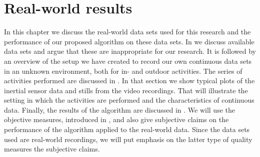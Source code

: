 
\chapter{Real-world results}

\label{Chapter6} %


In this chapter we discuss the real-world data sets used for this research and the performance of our proposed algorithm on these data sets.
In  we discuss available data sets and argue that these are inappropriate for our research.
It is followed by an overview of the setup we have created to record our own continuous data sets in an unknown environment, both for in- and outdoor activities.
The series of activities performed are discussed in .
In that section we show typical plots of the inertial sensor data and stills from the video recordings.
That will illustrate the setting in which the activities are performed and the characteristics of continuous data.
Finally, the results of the algorithm are discussed in .
We will use the objective measures, introduced in , and also give subjective claims on the performance of the algorithm applied to the real-world data.
Since the data sets used are real-world recordings, we will put emphasis on the latter type of quality measures \ie the subjective claims.



